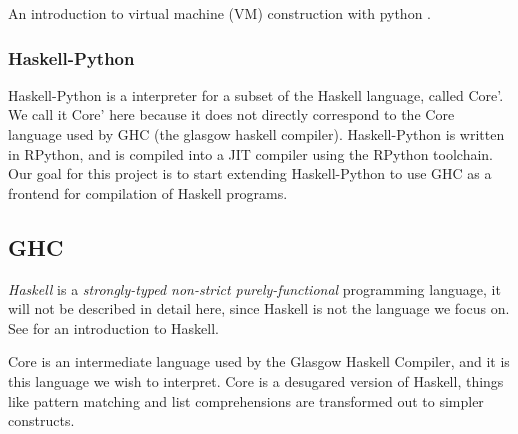 An introduction to virtual machine (VM) construction with python \cite{pypy}.

\subsubsection{Haskell-Python}

Haskell-Python is a interpreter for a subset of the Haskell language, called Core'.
We call it Core' here because it does not directly correspond to the Core language
used by GHC (the glasgow haskell compiler). Haskell-Python is written in RPython,
and is compiled into a JIT compiler using the RPython toolchain. Our goal for this
project is to start extending Haskell-Python to use GHC as a frontend for compilation 
of Haskell programs.

\subsection{GHC}

\emph{Haskell} is a \emph{strongly-typed non-strict purely-functional} programming language, it will not be
described in detail here, since Haskell is not the language we focus on. See \cite{hudak1992report}
for an introduction to Haskell. 

Core is an intermediate language used by the Glasgow Haskell Compiler\cite{ghc},
and it is this language we wish to interpret. Core is a desugared version of Haskell, things like pattern matching
and list comprehensions are transformed out to simpler constructs.\cite{jones1994compilation}


